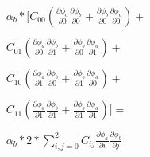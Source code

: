 \documentclass[a4paper,12pt]{article}
\begin{document}
\begin{equation}
    \begin{array}{c}
        \alpha_{b}*[

        C_{00}
        (\frac{\partial\phi_{a}}{\partial 0}\frac{\partial\phi_{b}}{\partial 0}+
        \frac{\partial\phi_{b}}{\partial 0}\frac{\partial\phi_{a}}{\partial 0})+ \\ \\

        C_{01}
        (\frac{\partial\phi_{a}}{\partial 0}\frac{\partial\phi_{b}}{\partial 1}+
        \frac{\partial\phi_{b}}{\partial 0}\frac{\partial\phi_{a}}{\partial 1})+ \\ \\

        C_{10}
        (\frac{\partial\phi_{a}}{\partial 1}\frac{\partial\phi_{b}}{\partial 0}+
        \frac{\partial\phi_{b}}{\partial 1}\frac{\partial\phi_{a}}{\partial 0})+ \\ \\

        C_{11}
        (\frac{\partial\phi_{a}}{\partial 1}\frac{\partial\phi_{b}}{\partial 1}+
        \frac{\partial\phi_{b}}{\partial 1}\frac{\partial\phi_{a}}{\partial 1}) ] = \\ \\
        \alpha_{b}*2*\sum_{i,j=0}^2C_{ij}\frac{\partial\phi_{a}}{\partial i}\frac{\partial\phi_{b}}{\partial j} \\ \\
\end{array}
\end{equation} 
\end{document}
